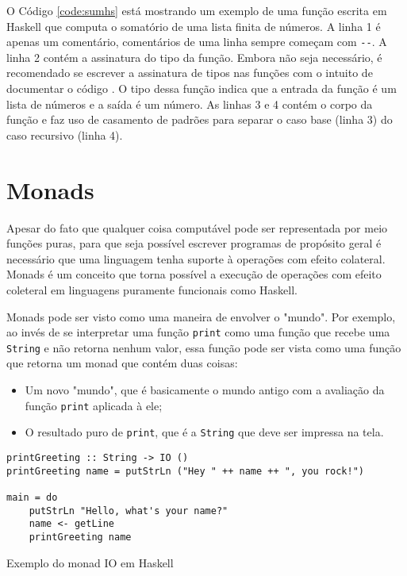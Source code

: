 O Código \ref{code:sumhs} está mostrando um exemplo de uma função escrita em Haskell que computa o somatório de uma lista finita de números. A linha 1 é apenas um comentário, comentários de uma linha sempre começam com \verb|--|. A linha 2 contém a assinatura do tipo da função. Embora não seja necessário, é recomendado se escrever a assinatura de tipos nas funções com o intuito de documentar o código \cite{jones2007practical}. O tipo dessa função indica que a entrada da função é um lista de números e a saída é um número. As linhas 3 e 4 contém o corpo da função e faz uso de casamento de padrões para separar o caso base (linha 3) do caso recursivo (linha 4).


\section{Monads}

Apesar do fato que qualquer coisa computável pode ser representada por meio funções puras, para que seja possível escrever programas de propósito geral é necessário que uma linguagem tenha suporte à operações com efeito colateral. Monads é um conceito que torna possível a execução de operações com efeito coleteral em linguagens puramente funcionais como Haskell.

Monads pode ser visto como uma maneira de envolver o "mundo". Por exemplo, ao invés de se interpretar uma função \verb|print| como uma função que recebe uma \verb|String| e não retorna nenhum valor, essa função pode ser vista como uma função que retorna um monad que contém duas coisas:
\begin{itemize}
  \item Um novo "mundo", que é basicamente o mundo antigo com a avaliação da função \verb|print| aplicada à ele;
  \item O resultado puro de \verb|print|, que é a \verb|String| que deve ser impressa na tela.
\end{itemize}

\begin{listing}
  \begin{verbatim}
printGreeting :: String -> IO ()
printGreeting name = putStrLn ("Hey " ++ name ++ ", you rock!")

main = do
    putStrLn "Hello, what's your name?"
    name <- getLine
    printGreeting name
  \end{verbatim}
  \caption{Exemplo do monad IO em Haskell}
  \label{code:monad}
\end{listing}

